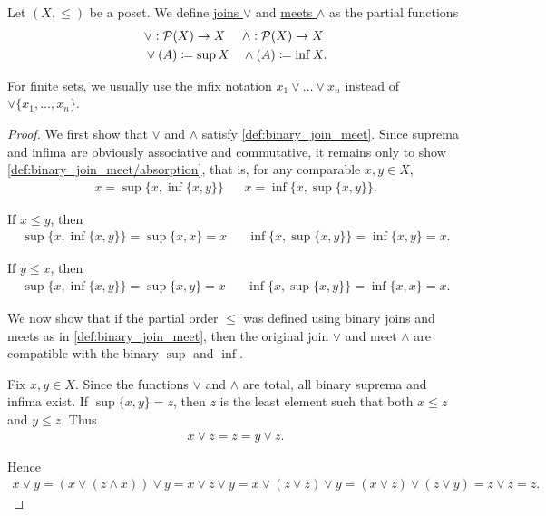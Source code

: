 \begin{definition}\label{def:join_meet}\cite[28]{Lectures:general_topology}
  Let $(X, \leq)$ be a poset. We define \uline{joins $\lor$} and \uline{meets $\land$} as the partial functions
  \begin{align*}
    &\lor: \operatorname{\mathcal P}(X) \to X
    &&\land: \operatorname{\mathcal P}(X) \to X
    \\
    &\lor(A) \coloneqq \sup X
    &&\land(A) \coloneqq \inf X.
  \end{align*}

  For finite sets, we usually use the infix notation $x_1 \lor \ldots \lor x_n$ instead of $\lor \{ x_1, \ldots, x_n \}$.
\end{definition}
\begin{proof}
  We first show that $\lor$ and $\land$ satisfy \cref{def:binary_join_meet}. Since suprema and infima are obviously associative and commutative, it remains only to show \ref{def:binary_join_meet/absorption}, that is, for any comparable $x, y \in X$,
  \begin{align*}
    x = \sup \{x, \inf \{ x, y \} \}
    &&
    x = \inf \{x, \sup \{ x, y \} \}.
  \end{align*}

  If $x \leq y$, then
  \begin{align*}
    \sup \{ x, \inf \{ x, y \} \} = \sup \{ x, x \} = x
    &&
    \inf \{ x, \sup \{ x, y \} \} = \inf \{ x, y \} = x.
  \end{align*}

  If $y \leq x$, then
  \begin{align*}
    \sup \{ x, \inf \{ x, y \} \} = \sup \{ x, y \} = x
    &&
    \inf \{ x, \sup \{ x, y \} \} = \inf \{ x, x \} = x.
  \end{align*}

  We now show that if the partial order $\leq$ was defined using binary joins and meets as in \cref{def:binary_join_meet}, then the original join $\lor$ and meet $\land$ are compatible with the binary $\sup$ and $\inf$.

  Fix $x, y \in X$. Since the functions $\lor$ and $\land$ are total, all binary suprema and infima exist. If $\sup \{ x, y \} = z$, then $z$ is the least element such that both $x \leq z$ and $y \leq z$. Thus
  \begin{align*}
    x \lor z = z = y \lor z.
  \end{align*}

  Hence
  \begin{align*}
    x \lor y = (x \lor (z \land x)) \lor y = x \lor z \lor y = x \lor (z \lor z) \lor y = (x \lor z) \lor (z \lor y) = z \lor z = z.
  \end{align*}


\end{proof}
